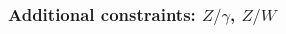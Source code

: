 \documentclass[aspectratio=169,xcolor=dvipsnames,,table,compress]{beamer}
\begin{document}
\begin{frame} \frametitle{Additional constraints: $Z/\gamma$, $Z/W$}
  \vspace{-5mm}
  \begin{columns}
    \begin{column}{0.3\textwidth}

\end{column}
\end{columns}
\end{frame}
\end{document}
